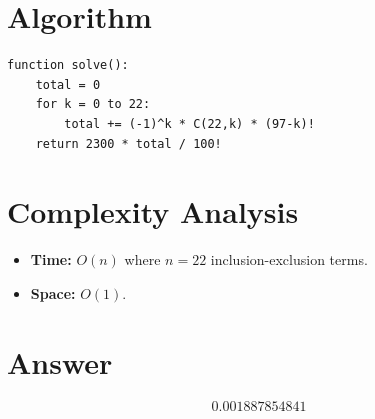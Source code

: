 \documentclass[12pt]{article}
\begin{document}
\section{Algorithm}

\begin{verbatim}
function solve():
    total = 0
    for k = 0 to 22:
        total += (-1)^k * C(22,k) * (97-k)!
    return 2300 * total / 100!
\end{verbatim}

\section{Complexity Analysis}
\begin{itemize}
    \item \textbf{Time:} $O(n)$ where $n = 22$ inclusion-exclusion terms.
    \item \textbf{Space:} $O(1)$.
\end{itemize}

\section{Answer}

\[
\boxed{0.001887854841}
\]
\end{document}
